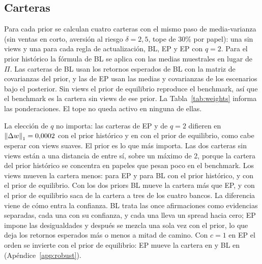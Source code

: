 \documentclass[11pt]{article}
\newcommand{\norm}[1]{\left\lVert #1 \right\rVert}
\begin{document}
\subsection{Carteras}

Para cada prior se calculan cuatro carteras con el mismo paso de
media-varianza (sin ventas en corto, aversi\'on al riesgo $\delta = 2{,}5$,
tope de 30\% por papel): una sin views y una para cada regla de
actualizaci\'on, BL, EP y EP con $q = 2$. Para el prior hist\'orico la f\'ormula
de BL se aplica con las medias muestrales en lugar de $\Pi$. Las carteras de BL
usan los retornos esperados de BL con la matriz de covarianzas del prior, y
las de EP usan las medias y covarianzas de los escenarios bajo el
posterior. Sin views el
prior de equilibrio reproduce el benchmark, as\'i que el benchmark es la
cartera sin views de ese prior. La Tabla~\ref{tab:weights} informa las
ponderaciones. El tope no queda activo en ninguna de ellas.

\begin{table}[t]
\centering
\footnotesize
\caption{Ponderaciones de las carteras (\%) al 22 de septiembre de 2025,
por prior y regla de actualizaci\'on. Retornos simples, sin ventas en corto,
tope de 30\%, $\delta = 2{,}5$, $\tau = 0{,}05$, confianza global $0{,}5$
para EP. \emph{Sin views} es la cartera de media-varianza de cada prior;
para el prior de equilibrio es el benchmark. La \'ultima fila es la distancia
$\ell_1$ a la cartera sin views del mismo prior.}
\label{tab:weights}

\end{table}

La elecci\'on de $q$ no importa: las
carteras de EP y de $q=2$ difieren en $\norm{\Delta w}_1 = \nLoneQhist$ con
el prior hist\'orico y en \nLoneQeq{} con el prior de equilibrio, como cabe
esperar con views suaves. El prior es lo que m\'as importa. Las dos carteras
sin views est\'an a una distancia de \nLonePrior{} entre s\'i, sobre un m\'aximo
de 2, porque la cartera del prior hist\'orico se concentra en papeles que
pesan poco en el benchmark. Los views mueven la cartera menos: \nLoneEPhist{} para EP y
\nLoneBLhist{} para BL con el prior hist\'orico, \nLoneEPeq{} y \nLoneBLeq{}
con el prior de equilibrio. Con los dos priors BL mueve la cartera m\'as que EP, y con
el prior de equilibrio saca de la cartera a tres de los cuatro bancos. La
diferencia viene de c\'omo entra la confianza. BL trata las once
afirmaciones como evidencias separadas, cada una con su confianza, y cada
una lleva un spread hacia cero; EP impone las desigualdades y despu\'es se
mezcla una sola vez con el prior, lo que deja los retornos esperados m\'as o
menos a mitad de camino. Con $c=1$ en EP el orden se invierte con el prior
de equilibrio: EP mueve la cartera en \nLoneEPeqFull{} y BL en \nLoneBLeq{}
(Ap\'endice~\ref{app:robust}).
\end{document}
